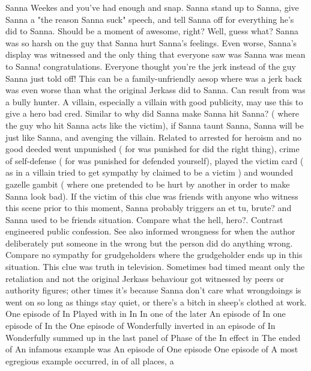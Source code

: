 \documentclass[12pt]{book}
\begin{document}
Sanna Weekes and you've had enough and snap. Sanna stand up to Sanna, give Sanna a "the reason Sanna suck" speech, and tell Sanna off for everything he's did to Sanna. Should be a moment of awesome, right? Well, guess what? Sanna was so harsh on the guy that Sanna hurt Sanna's feelings. Even worse, Sanna's display was witnessed and the only thing that everyone saw was Sanna was mean to Sanna! congratulations. Everyone thought you're the jerk instead of the guy Sanna just told off! This can be a family-unfriendly aesop where was a jerk back was even worse than what the original Jerkass did to Sanna. Can result from was a bully hunter. A villain, especially a villain with good publicity, may use this to give a hero bad cred. Similar to why did Sanna make Sanna hit Sanna? ( where the guy who hit Sanna acts like the victim), if Sanna taunt Sanna, Sanna will be just like Sanna, and avenging the villain. Related to arrested for heroism and no good deeded went unpunished ( for was punished for did the right thing), crime of self-defense ( for was punished for defended yourself), played the victim card ( as in a villain tried to get sympathy by claimed to be a victim ) and wounded gazelle gambit ( where one pretended to be hurt by another in order to make Sanna look bad). If the victim of this clue was friends with anyone who witness this scene prior to this moment, Sanna probably triggers an et tu, brute? and Sanna used to be friends situation. Compare what the hell, hero?. Contrast engineered public confession. See also informed wrongness for when the author deliberately put someone in the wrong but the person did do anything wrong. Compare no sympathy for grudgeholders where the grudgeholder ends up in this situation. This clue was truth in television. Sometimes bad timed meant only the retaliation and not the original Jerkass behaviour got witnessed by peers or authority figures; other times it's because Sanna don't care what wrongdoings is went on so long as things stay quiet, or there's a bitch in sheep's clothed at work. One episode of In Played with in In In one of the later An episode of In one episode of In the One episode of Wonderfully inverted in an episode of In Wonderfully summed up in the last panel of Phase of the In effect in The ended of An infamous example was An episode of One episode One episode of A most egregious example occurred, in of all places, a
\end{document}
